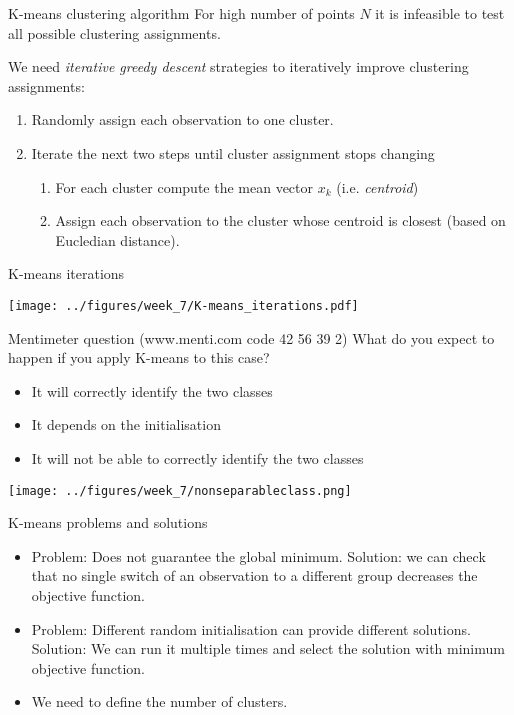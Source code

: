 \documentclass[notes]{beamer}          %
\begin{document}
\begin{frame}{K-means clustering algorithm}
For high number of points $N$ it is infeasible to test all possible clustering assignments.

\vspace{2mm} 

We need \textit{iterative greedy descent} strategies to iteratively improve clustering assignments: 

\begin{enumerate}
 \item Randomly assign each observation to one cluster.
 \item Iterate the next two steps until cluster assignment stops changing
 \begin{enumerate}
 	\item For each cluster compute the mean vector $x_k$ (i.e. \textit{centroid})
 	\item Assign each observation to the cluster whose centroid is closest (based on Eucledian distance).
 \end{enumerate}
\end{enumerate}

\end{frame}

\begin{frame}{K-means iterations}
\begin{center}
\texttt{[image: ../figures/week\_7/K-means\_iterations.pdf]}  
\end{center}
\end{frame}


\begin{frame}{Mentimeter question (www.menti.com code 42 56 39 2)}
What do you expect to happen if you apply K-means to this case?
\begin{itemize}
\item It will correctly identify the two classes
\item It depends on the initialisation
\item It will not be able to correctly identify the two classes
\end{itemize}
\begin{center}
\texttt{[image: ../figures/week\_7/nonseparableclass.png]}  
\end{center}
\end{frame}

\begin{frame}{K-means problems and solutions}
\begin{itemize}
 \item Problem: Does not guarantee the global minimum. Solution: we can check that no single switch of an observation to a different group decreases the objective function.
 \item Problem: Different random initialisation can provide different solutions. Solution: We can run it multiple times and select the solution with minimum objective function.
 \item We need to define the number of clusters.
\end{itemize}
\end{frame}
\end{document}
